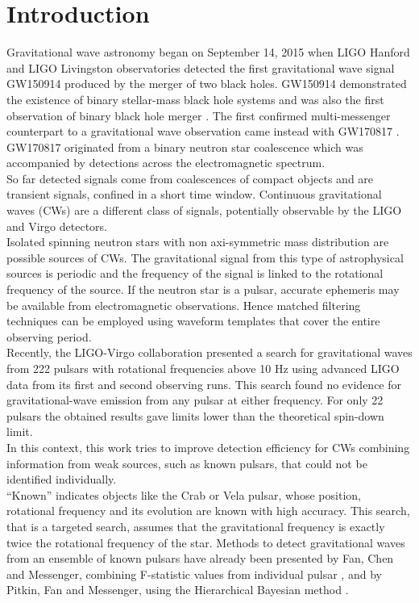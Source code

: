 \documentclass[11pt,a4paper,final]{iopart}
\begin{document}
\section{Introduction}
Gravitational wave astronomy began on September 14, 2015 when LIGO Hanford and LIGO Livingston observatories detected the first gravitational wave signal GW150914 \cite{firstdet} produced by the merger of two black holes. GW150914 demonstrated the existence of binary stellar-mass black hole systems and was also the first observation of binary black hole merger \cite{astimpl}. The first confirmed multi-messenger counterpart to a gravitational wave observation came instead with GW170817 \cite{firstBBS}. GW170817 originated  from  a  binary  neutron  star coalescence  which  was accompanied by detections across the electromagnetic spectrum.
\\So far detected signals come from coalescences of compact objects and are transient signals, confined in a short time window. Continuous gravitational waves (CWs) are a different class of signals, potentially observable by the LIGO and Virgo detectors.
\\ Isolated spinning neutron stars with non axi-symmetric mass distribution are possible sources of CWs. The gravitational signal from this type of astrophysical sources is periodic and the frequency of the signal is linked to the rotational frequency of the source.  If the neutron star is a pulsar, accurate ephemeris may be available from electromagnetic observations. Hence matched filtering techniques can be employed using waveform templates that cover the entire observing period. 
\\Recently, the LIGO-Virgo collaboration presented a search \cite{result} for gravitational waves from 222 pulsars with rotational frequencies above 10 Hz using advanced LIGO data from its first and second observing runs. This search found no evidence for gravitational-wave emission from any pulsar at either frequency. For only 22 pulsars the obtained results gave limits lower than the theoretical spin-down limit.
\\In this context, this work tries to improve detection efficiency for CWs combining information from weak sources, such as known pulsars, that could not be identified individually. 
\\“Known” indicates objects like the Crab or Vela pulsar, whose position, rotational frequency and its evolution are known with high accuracy. This search, that is a targeted search, assumes that the gravitational frequency is exactly twice the rotational frequency of the star. Methods to detect gravitational waves from an ensemble of known pulsars have already been presented by Fan, Chen and Messenger, combining F-statistic values from individual pulsar \cite{Fstat2}, and by Pitkin, Fan and Messenger, using the Hierarchical Bayesian method \cite{bayes}. 
\end{document}
